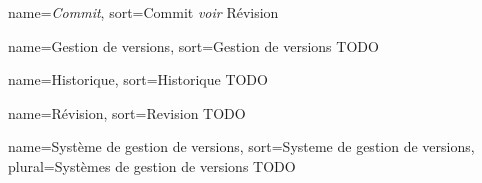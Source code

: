 
{
name={\it Commit\/},
sort=Commit
}
{{\it voir\/} Révision}

{
name=Gestion de versions,
sort=Gestion de versions
}
{TODO}

{
name=Historique,
sort=Historique
}
{TODO}

{
name=Révision,
sort=Revision
}
{TODO}

{
  name=Système de gestion de versions,
  sort=Systeme de gestion de versions,
  plural=Systèmes de gestion de versions
}
{TODO}